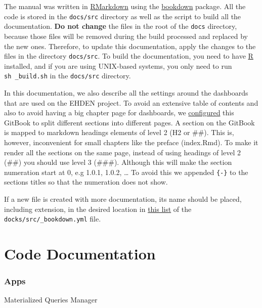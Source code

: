 \documentclass[
]{book}
\begin{document}
The manual was written in \href{https://rmarkdown.rstudio.com}{RMarkdown} using the \href{https://bookdown.org}{bookdown} package.
All the code is stored in the \texttt{docs/src} directory as well as the script to build all the documentation.
\textbf{Do not change} the files in the root of the \texttt{docs} directory, because those files will be removed during the build processed and replaced by the new ones.
Therefore, to update this documentation, apply the changes to the files in the directory \texttt{docs/src}.
To build the documentation, you need to have \href{https://www.r-project.org/}{R} installed, and if you are using UNIX-based systems, you only need to run \texttt{sh\ \_build.sh} in the \texttt{docs/src} directory.

In this documentation, we also describe all the settings around the dashboards that are used on the EHDEN project.
To avoid an extensive table of contents and also to avoid having a big chapter page for dashboards, we \href{https://github.com/EHDEN/NetworkDashboards/blob/master/docs/src/_output.yml\#L9}{configured} this GitBook to split different sections into different pages.
A section on the GitBook is mapped to markdown headings elements of level 2 (H2 or \#\#).
This is, however, inconvenient for small chapters like the preface (index.Rmd).
To make it render all the sections on the same page, instead of using headings of level 2 (\#\#) you should use level 3 (\#\#\#).
Although this will make the section numeration start at 0, e.g 1.0.1, 1.0.2, \ldots{}
To avoid this we appended \texttt{\{-\}} to the sections titles so that the numeration does not show.

If a new file is created with more documentation, its name should be placed, including extension, in the desired location in \href{https://github.com/EHDEN/NetworkDashboards/blob/master/docs/src/_bookdown.yml\#L26-L45}{this list} of the \texttt{docks/src/\_bookdown.yml} file.

\hypertarget{code-documentation}{%
\chapter{Code Documentation}\label{code-documentation}}

\hypertarget{apps}{%
\subsection*{Apps}\label{apps}}

Materialized Queries Manager
\end{document}
